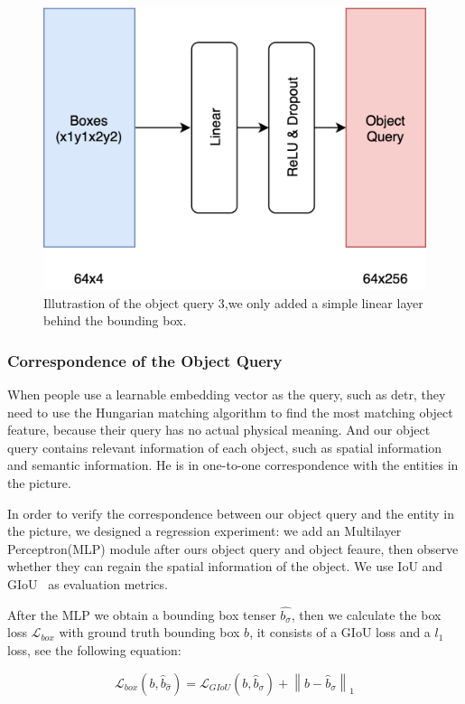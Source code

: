 \begin{figure}[tbph!]
	\centering
	\includegraphics[width=0.5\linewidth]{figures/obj_query2}
	\caption[Illutrastion of the object query 3]{Illutrastion of the object query 3,we only added a simple linear layer behind the bounding box.}
	\label{fig:objquery2}
\end{figure}

\subsubsection{Correspondence of the Object Query }

When people use a learnable embedding vector as the query, such as detr, they need to use the Hungarian matching algorithm to find the most matching object feature, because their query has no actual physical meaning. And our object query contains relevant information of each object, such as spatial information and semantic information. He is in one-to-one correspondence with the entities in the picture.

In order to verify the correspondence between our object query and the entity in the picture, we designed a regression experiment: we add an Multilayer Perceptron(MLP) module after ours object query and object feaure, then observe whether they can regain the spatial information of the object. We use IoU and GIoU~\cite{rezatofighi2019generalized}  as evaluation metrics.

After the MLP we obtain a bounding box tenser $ \hat{b_\sigma} $, then we calculate the box loss $\mathcal{L}_{box}$ with ground truth bounding box $b$, it consists of a GIoU loss and a $l_1$ loss, see the following equation:

$$ \mathcal{L}_{box}(b,\hat{b}_{\hat{\sigma}}) = \mathcal{L}_{GIoU}(b,\hat{b}_{\sigma}) + \left \| b - \hat{b}_{\sigma}  \right \| _1 $$

